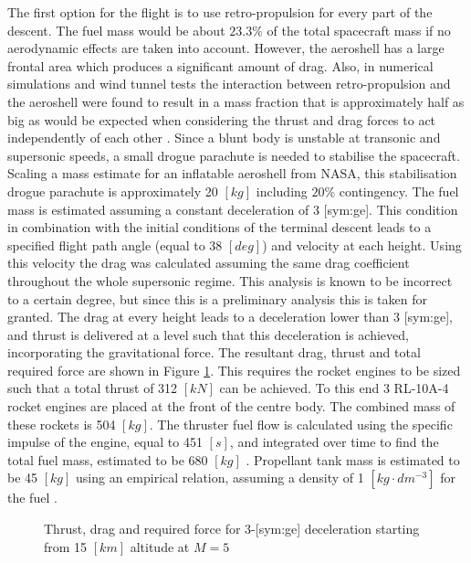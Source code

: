 The first option for the flight is to use retro-propulsion for every part of the descent. The fuel mass would be about $23.3\%$ of the total spacecraft mass if no aerodynamic effects are taken into account. However, the aeroshell has a large frontal area which produces a significant amount of drag. Also, in numerical simulations and wind tunnel tests the interaction between retro-propulsion and the aeroshell were found to result in a mass fraction that is approximately half as big as would be expected when considering the thrust and drag forces to act independently of each other \cite{Korzun2009}. Since a blunt body is unstable at transonic and supersonic speeds, a small drogue parachute is needed to stabilise the spacecraft. Scaling a mass estimate for an inflatable aeroshell from NASA, this stabilisation drogue parachute is approximately 20 $[kg]$ including $20\%$ contingency.
The fuel mass is estimated assuming a constant deceleration of 3 [\gls{sym:ge}]. This condition in combination with the initial conditions of the terminal descent leads to a specified flight path angle (equal to 38 $[deg]$) and velocity at each height. Using this velocity the drag was calculated assuming the same drag coefficient throughout the whole supersonic regime. This analysis is known to be incorrect to a certain degree, but since this is a preliminary analysis this is taken for granted. The drag at every height leads to a deceleration lower than 3 [\gls{sym:ge}], and thrust is delivered at a level such that this deceleration is achieved, incorporating the gravitational force. The resultant drag, thrust and total required force are shown in Figure \ref{fig:TDforce}. This requires the rocket engines to be sized such that a total thrust of 312 $[kN]$ can be achieved. To this end 3 RL-10A-4 rocket engines are placed at the front of the centre body. The combined mass of these rockets is 504 $[kg]$. The thruster fuel flow is calculated using the specific impulse of the engine, equal to 451 $[s]$, and integrated over time to find the total fuel mass, estimated to be 680 $[kg]$ \cite{Wertz2011}. Propellant tank mass is estimated to be 45 $[kg]$ using an empirical relation, assuming a density of 1 $[kg\cdot dm^{-3}]$ for the fuel \cite{Wertz2011}.

\begin{figure}
	\centering
	\setlength{} 
	\setlength{}
	
	\caption{Thrust, drag and required force for 3-[\gls{sym:ge}] deceleration starting from 15 $[km]$ altitude at $M=5$}
	\label{fig:TDforce}
\end{figure}


